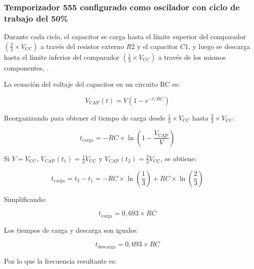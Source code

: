 \subsubsection{Temporizador 555 configurado como oscilador con ciclo de trabajo del 50\%}

Durante cada ciclo, el capacitor se carga hasta el límite superior del comparador \(\left(\frac{2}{3} \times V_\mathrm{CC}\right)\) a través del resistor externo \(R{2}\) y el capacitor \(C{1}\), y luego se descarga hasta el límite inferior del comparador \(\left(\frac{1}{3} \times V_\mathrm{CC}\right)\) a través de los mismos componentes, \parencite{ti-555calculation}.

La ecuación del voltaje del capacitor en un circuito RC es:

\begin{equation}
V_\mathrm{CAP}(t) = V \left( 1 - e^{-t / RC} \right)
\label{eq:inversor:vcap}
\end{equation}

Reorganizando para obtener el tiempo de carga desde \(\frac{1}{3} \times V_\mathrm{CC}\) hasta \(\frac{2}{3} \times V_\mathrm{CC}\):

\begin{equation}
t_\mathrm{carga} = -RC \times \ln\left(1 - \frac{V_\mathrm{CAP}}{V} \right)
\label{eq:inversor:tcarga_general}
\end{equation}

Si \(V = V_\mathrm{CC}\), \(V_\mathrm{CAP}(t_1) = \frac{1}{3}V_\mathrm{CC}\) y \(V_\mathrm{CAP}(t_2) = \frac{2}{3}V_\mathrm{CC}\), se obtiene:

\begin{equation}
t_\mathrm{carga} = t_2 - t_1 = -RC \times \ln\left( \frac{1}{3} \right) + RC \times \ln\left( \frac{2}{3} \right)
\label{eq:inversor:tcarga_log}
\end{equation}

Simplificando:

\begin{equation}
t_\mathrm{carga} = 0{,}693 \times RC
\label{eq:inversor:tcarga_final}
\end{equation}

Los tiempos de carga y descarga son iguales:

\begin{equation}
t_\mathrm{descarga} = 0{,}693 \times RC
\label{eq:inversor:tdescarga}
\end{equation}

Por lo que la frecuencia resultante es:

